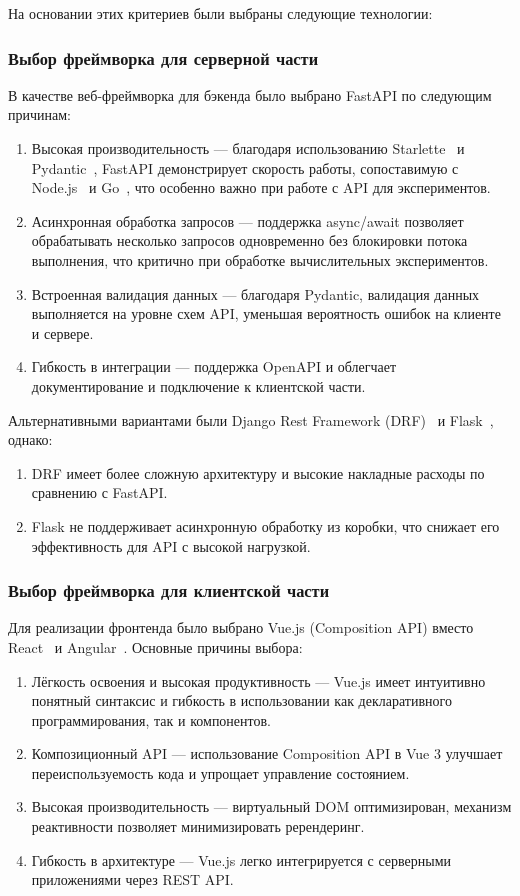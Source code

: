 На основании этих критериев были выбраны следующие технологии:

\subsubsection{Выбор фреймворка для серверной части}

В качестве веб-фреймворка для бэкенда было выбрано FastAPI по следующим причинам:
\begin{enumerate}
    \item Высокая производительность — благодаря использованию Starlette~\cite{Framework:Starlette} и Pydantic~\cite{Library:Pydantic}, FastAPI демонстрирует скорость работы, сопоставимую с Node.js~\cite{Lang:NodeJS} и Go~\cite{Lang:Go}, что особенно важно при работе с API для экспериментов.
    \item Асинхронная обработка запросов — поддержка async/await позволяет обрабатывать несколько запросов одновременно без блокировки потока выполнения, что критично при обработке вычислительных экспериментов.
    \item Встроенная валидация данных — благодаря Pydantic, валидация данных выполняется на уровне схем API, уменьшая вероятность ошибок на клиенте и сервере.
    \item Гибкость в интеграции — поддержка OpenAPI и облегчает документирование и подключение к клиентской части.
\end{enumerate}

Альтернативными вариантами были Django Rest Framework (DRF)~\cite{Framework:DRF} и Flask~\cite{Framework:Flask}, однако:
\begin{enumerate}
    \item DRF имеет более сложную архитектуру и высокие накладные расходы по сравнению с FastAPI.
    \item Flask не поддерживает асинхронную обработку из коробки, что снижает его эффективность для API с высокой нагрузкой.
\end{enumerate}

\subsubsection{Выбор фреймворка для клиентской части}

Для реализации фронтенда было выбрано Vue.js (Composition API) вместо React~\cite{Framework:React} и Angular~\cite{Framework:Angular}. Основные причины выбора:
\begin{enumerate}
    \item Лёгкость освоения и высокая продуктивность — Vue.js имеет интуитивно понятный синтаксис и гибкость в использовании как декларативного программирования, так и компонентов.
    \item Композиционный API — использование Composition API в Vue 3 улучшает переиспользуемость кода и упрощает управление состоянием.
    \item Высокая производительность — виртуальный DOM оптимизирован, механизм реактивности позволяет минимизировать ререндеринг.
    \item Гибкость в архитектуре — Vue.js легко интегрируется с серверными приложениями через REST API.
\end{enumerate}

